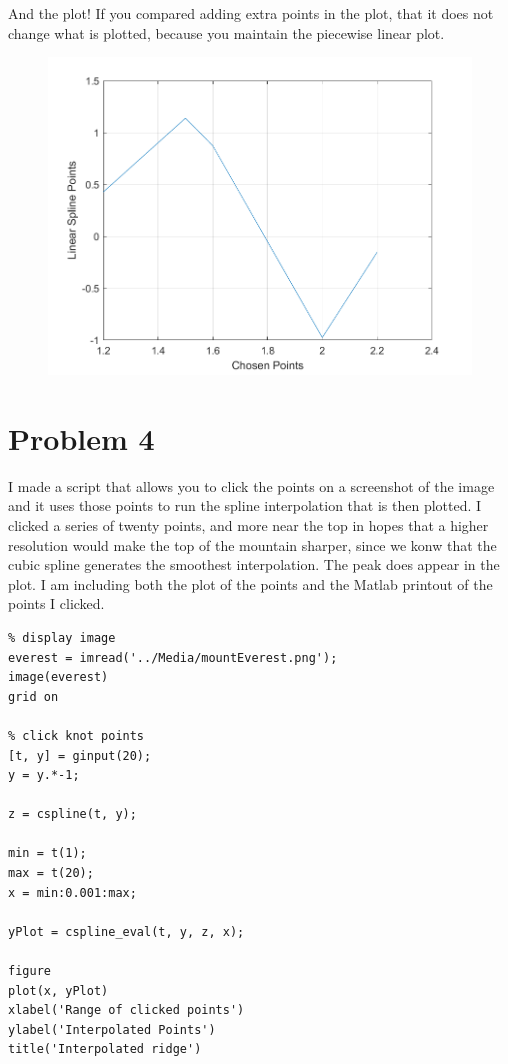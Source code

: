 \documentclass[]{article}
\begin{document}
And the plot! If you compared adding extra points in the plot, that it
does not change what is plotted, because you maintain the piecewise
linear plot.

\begin{figure}
\centering
\includegraphics{./Media/problem3Plot.png}
\caption{}
\end{figure}

\section{Problem 4}\label{problem-4}

I made a script that allows you to click the points on a screenshot of
the image and it uses those points to run the spline interpolation that
is then plotted. I clicked a series of twenty points, and more near the
top in hopes that a higher resolution would make the top of the mountain
sharper, since we konw that the cubic spline generates the smoothest
interpolation. The peak does appear in the plot. I am including both the
plot of the points and the Matlab printout of the points I clicked.

\begin{verbatim}
% display image
everest = imread('../Media/mountEverest.png');
image(everest)
grid on

% click knot points
[t, y] = ginput(20);
y = y.*-1;

z = cspline(t, y);

min = t(1);
max = t(20);
x = min:0.001:max;

yPlot = cspline_eval(t, y, z, x);

figure
plot(x, yPlot)
xlabel('Range of clicked points')
ylabel('Interpolated Points')
title('Interpolated ridge')
\end{verbatim}
\end{document}
